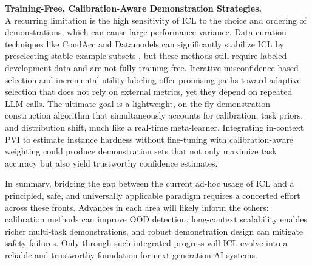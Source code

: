 \documentclass[11pt]{article}
\begin{document}
\textbf{Training-Free, Calibration-Aware Demonstration Strategies.}\\
A recurring limitation is the high sensitivity of ICL to the choice and ordering of demonstrations, which can cause large performance variance. Data curation techniques like CondAcc and Datamodels can significantly stabilize ICL by preselecting stable example subsets \cite{ref76}, but these methods still require labeled development data and are not fully training-free. Iterative misconfidence-based selection \cite{ref189} and incremental utility labeling \cite{ref190} offer promising paths toward adaptive selection that does not rely on external metrics, yet they depend on repeated LLM calls. The ultimate goal is a lightweight, on-the-fly demonstration construction algorithm that simultaneously accounts for calibration, task priors, and distribution shift, much like a real-time meta-learner. Integrating in-context PVI to estimate instance hardness without fine-tuning \cite{ref186} with calibration-aware weighting could produce demonstration sets that not only maximize task accuracy but also yield trustworthy confidence estimates.

In summary, bridging the gap between the current ad-hoc usage of ICL and a principled, safe, and universally applicable paradigm requires a concerted effort across these fronts. Advances in each area will likely inform the others: calibration methods can improve OOD detection, long-context scalability enables richer multi-task demonstrations, and robust demonstration design can mitigate safety failures. Only through such integrated progress will ICL evolve into a reliable and trustworthy foundation for next-generation AI systems.
\end{document}
